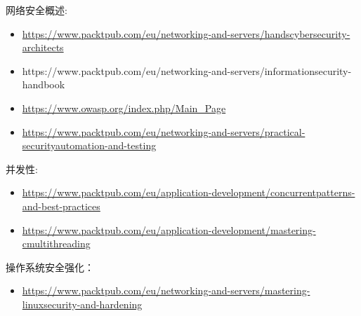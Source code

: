 
网络安全概述:

\begin{itemize}
\item 
\url{https://www.packtpub.com/eu/networking-and-servers/handscybersecurity-architects}

\item 
https://www.packtpub.com/eu/networking-and-servers/informationsecurity-handbook

\item 
\url{https://www.owasp.org/index.php/Main\_Page}

\item 
\url{https://www.packtpub.com/eu/networking-and-servers/practical-securityautomation-and-testing}
\end{itemize}


并发性:

\begin{itemize}
\item 
\url{https://www.packtpub.com/eu/application-development/concurrentpatterns-and-best-practices}

\item 
\url{https://www.packtpub.com/eu/application-development/mastering-cmultithreading}
\end{itemize}

操作系统安全强化：

\begin{itemize}
\item 
\url{https://www.packtpub.com/eu/networking-and-servers/mastering-linuxsecurity-and-hardening}
\end{itemize}